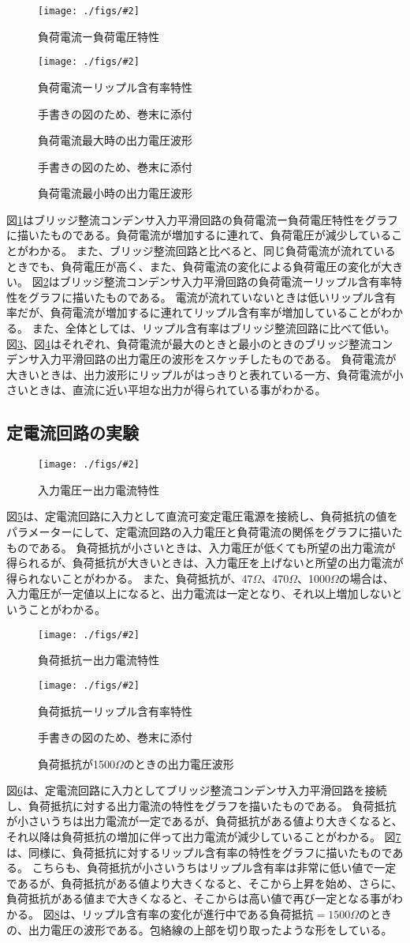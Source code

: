 \documentclass[11pt]{jsarticle}
\newcommand{\fg}[3]{ %
    \begin{figure}
        \begin{center}
            \texttt{[image: ./figs/\#2]}
            \caption{#3}
            \label{#1}
        \end{center}
    \end{figure}
}
\newcommand{\dummyfig}[2]{
    \begin{figure}
        \begin{center}
            \begin{shadebox}
                手書きの図のため、巻末に添付
            \end{shadebox}
            \caption{#2}
            \label{#1}
        \end{center}
    \end{figure}
}
\newcommand{\fr}[1]{図\ref{#1}}
\begin{document}
\fg{fig10}{{2.voltage}.png}{負荷電流ー負荷電圧特性}
\fg{fig11}{{2.ripple}.png}{負荷電流ーリップル含有率特性}
\dummyfig{fig12}{負荷電流最大時の出力電圧波形}
\dummyfig{fig13}{負荷電流最小時の出力電圧波形}

\fr{fig10}はブリッジ整流コンデンサ入力平滑回路の負荷電流ー負荷電圧特性をグラフに描いたものである。負荷電流が増加するに連れて、負荷電圧が減少していることがわかる。
また、ブリッジ整流回路と比べると、同じ負荷電流が流れているときでも、負荷電圧が高く、また、負荷電流の変化による負荷電圧の変化が大きい。
\fr{fig11}はブリッジ整流コンデンサ入力平滑回路の負荷電流ーリップル含有率特性をグラフに描いたものである。
電流が流れていないときは低いリップル含有率だが、負荷電流が増加するに連れてリップル含有率が増加していることがわかる。
また、全体としては、リップル含有率はブリッジ整流回路に比べて低い。
\fr{fig12}、\fr{fig13}はそれぞれ、負荷電流が最大のときと最小のときのブリッジ整流コンデンサ入力平滑回路の出力電圧の波形をスケッチしたものである。
負荷電流が大きいときは、出力波形にリップルがはっきりと表れている一方、負荷電流が小さいときは、直流に近い平坦な出力が得られている事がわかる。

\subsection{定電流回路の実験}
\fg{fig14}{{3.voltage}.png}{入力電圧ー出力電流特性}
\fr{fig14}は、定電流回路に入力として直流可変定電圧電源を接続し、負荷抵抗の値をパラメーターにして、定電流回路の入力電圧と負荷電流の関係をグラフに描いたものである。
負荷抵抗が小さいときは、入力電圧が低くても所望の出力電流が得られるが、負荷抵抗が大きいときは、入力電圧を上げないと所望の出力電流が得られないことがわかる。
また、負荷抵抗が、47$\Omega$、470$\Omega$、1000$\Omega$の場合は、入力電圧が一定値以上になると、出力電流は一定となり、それ以上増加しないということがわかる。

\fg{fig15}{{4.current}.png}{負荷抵抗ー出力電流特性}
\fg{fig16}{{4.ripple}.png}{負荷抵抗ーリップル含有率特性}
\dummyfig{fig17}{負荷抵抗が1500$\Omega$のときの出力電圧波形}
\fr{fig15}は、定電流回路に入力としてブリッジ整流コンデンサ入力平滑回路を接続し、負荷抵抗に対する出力電流の特性をグラフを描いたものである。
負荷抵抗が小さいうちは出力電流が一定であるが、負荷抵抗がある値より大きくなると、それ以降は負荷抵抗の増加に伴って出力電流が減少していることがわかる。
\fr{fig16}は、同様に、負荷抵抗に対するリップル含有率の特性をグラフに描いたものである。
こちらも、負荷抵抗が小さいうちはリップル含有率は非常に低い値で一定であるが、負荷抵抗がある値より大きくなると、そこから上昇を始め、さらに、負荷抵抗がある値まで大きくなると、そこからは高い値で再び一定となる事がわかる。
\fr{fig17}は、リップル含有率の変化が進行中である負荷抵抗$=1500\Omega$のときの、出力電圧の波形である。包絡線の上部を切り取ったような形をしている。
\end{document}

